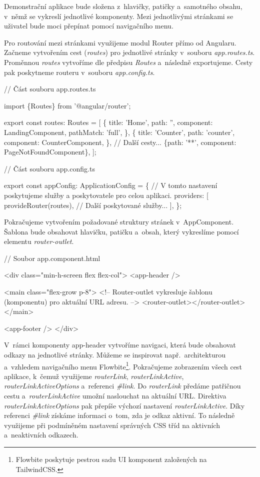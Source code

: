 Demonstrační aplikace bude složena z~hlavičky, patičky a~samotného obsahu, v~němž se vykreslí jednotlivé komponenty. 
Mezi jednotlivými stránkami se uživatel bude moci přepínat pomocí navigačního menu.

Pro routování mezi stránkami využijeme modul Router přímo od Angularu. Začneme vytvořením cest (\emph{routes}) pro jednotlivé stránky v~souboru \emph{app.routes.ts}. 
Proměnnou \emph{routes} vytvoříme dle předpisu \emph{Routes} a~následně exportujeme. Cesty pak poskytneme routeru v~souboru \emph{app.config.ts}.

\begin{prog}
// Část souboru app.routes.ts

import \{Routes\} from '@angular/router';

export const routes: Routes = [
  \{
    title: 'Home',
    path: '',
    component: LandingComponent,
    pathMatch: 'full',
  \},
  \{
    title: 'Counter',
    path: 'counter',
    component: CounterComponent,
  \},
  // Další cesty...
  \{path: '**', component: PageNotFoundComponent\},
];

// Část souboru app.config.ts

export const appConfig: ApplicationConfig = \{
  // V tomto nastavení poskytujeme služby a poskytovatele pro celou aplikaci.
  providers: [
    provideRouter(routes),
    // Další poskytované služby...
  ],
\};
\end{prog}

Pokračujeme vytvořením požadované struktury stránek v~AppComponent. Šablona bude obsahovat hlavičku, patičku a~obsah, který vykreslíme pomocí elementu \emph{router-outlet}. 

\begin{prog}
// Soubor app.component.html

<div class="min-h-screen flex flex-col">
  <app-header />

  <main class="flex-grow p-8">
    <!-- Router-outlet vykresluje šablonu (komponentu) pro aktuální URL adresu. -->
    <router-outlet></router-outlet>
  </main>

  <app-footer />
</div>
\end{prog}

V~rámci komponenty app-header vytvoříme navigaci, která bude obsahovat odkazy na jednotlivé stránky. 
Můžeme se inspirovat např.~architekturou a~vzhledem navigačního menu Flowbite\footnote{Flowbite poskytuje pestrou sadu UI komponent založených na TailwindCSS.\cite{flowbitetwheader}}. 
Pokračujeme zobrazením všech cest aplikace, k~čemuž využijeme \emph{routerLink}, \emph{routerLinkActive}, \emph{routerLinkActiveOptions} a~referenci \emph{\#link}. 
Do \emph{routerLink} předáme patřičnou cestu a~\emph{routerLinkActive} umožní naslouchat na aktuální URL. Direktiva \emph{routerLinkActiveOptions} pak přepíše výchozí nastavení \emph{routerLinkActive}.
Díky referenci \emph{\#link} získáme informaci o~tom, zda je odkaz aktivní. To následně využijeme při podmíněném nastavení správných CSS tříd na aktivních a~neaktivních odkazech.

